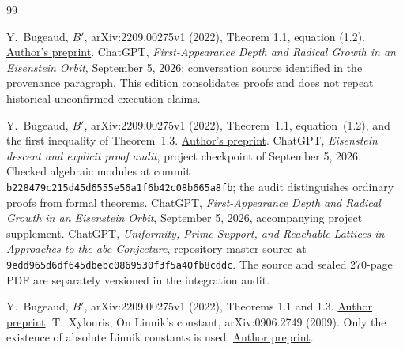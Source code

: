 \documentclass[11pt]{amsart}
\theoremstyle{definition}
\theoremstyle{remark}
\newcommand{\N}{\mathbb N}
\newcommand{\Q}{\mathbb Q}
\newcommand{\Z}{\mathbb Z}
\newcommand{\rad}{\operatorname{rad}}
\newcommand{\eps}{\varepsilon}
\begin{document}
\begin{thebibliography}{99}
\endgroup
\begingroup
\let\Z\relax
\newcommand{\Z}{\mathbb Z}
\let\N\relax
\newcommand{\N}{\mathbb N}
\let\rad\relax
\newcommand{\rad}{\operatorname{rad}}
\let\eps\relax
\newcommand{\eps}{\varepsilon}

 Y.~Bugeaud, $B'$, arXiv:2209.00275v1 (2022), Theorem 1.1, equation (1.2). \href{https://arxiv.org/abs/2209.00275}{Author's preprint}.
 ChatGPT, \emph{First-Appearance Depth and Radical Growth in an Eisenstein Orbit}, September 5, 2026; conversation source identified in the provenance paragraph. This edition consolidates proofs and does not repeat historical unconfirmed execution claims.

\endgroup
\begingroup
\let\Z\relax
\newcommand{\Z}{\mathbb Z}
\let\Q\relax
\newcommand{\Q}{\mathbb Q}
\let\N\relax
\newcommand{\N}{\mathbb N}
\let\rad\relax
\newcommand{\rad}{\operatorname{rad}}
\let\eps\relax
\newcommand{\eps}{\varepsilon}
\let\EE\relax
\newcommand{\EE}{\mathcal E}
\let\HH\relax
\newcommand{\HH}{\mathcal A}

 Y.~Bugeaud, $B'$, arXiv:2209.00275v1 (2022), Theorem~1.1, equation~(1.2), and the first inequality of Theorem~1.3. \href{https://arxiv.org/abs/2209.00275}{Author's preprint}.
 ChatGPT, \emph{Eisenstein descent and explicit proof audit}, project checkpoint of September 5, 2026. Checked algebraic modules at commit \texttt{b228479c215d45d6555e56a1f6b42c08b665a8fb}; the audit distinguishes ordinary proofs from formal theorems.
 ChatGPT, \emph{First-Appearance Depth and Radical Growth in an Eisenstein Orbit}, September 5, 2026, accompanying project supplement.
 ChatGPT, \emph{Uniformity, Prime Support, and Reachable Lattices in Approaches to the abc Conjecture}, repository master source at \texttt{9edd965d6df645dbebc0869530f3f5a40fb8cddc}. The source and sealed 270-page PDF are separately versioned in the integration audit.

\endgroup
 Y.~Bugeaud, $B'$, arXiv:2209.00275v1 (2022), Theorems 1.1 and 1.3. \href{https://arxiv.org/abs/2209.00275}{Author preprint}.
 T.~Xylouris, On Linnik's constant, arXiv:0906.2749 (2009). Only the existence of absolute Linnik constants is used. \href{https://arxiv.org/abs/0906.2749}{Author preprint}.


\end{thebibliography}
\end{document}
